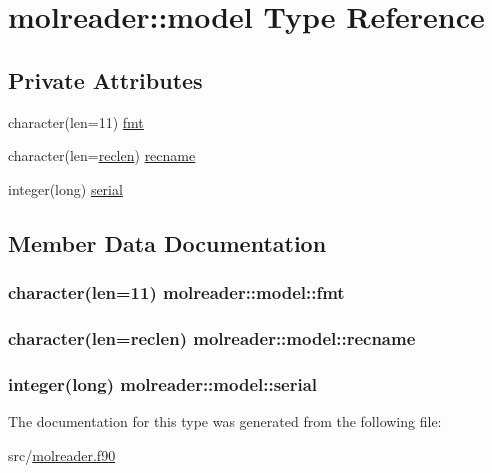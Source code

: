 \hypertarget{structmolreader_1_1model}{\section{molreader\-:\-:model Type Reference}
\label{structmolreader_1_1model}
}
\subsection*{Private Attributes}
\begin{DoxyCompactItemize}
\item 
character(len=11) \hyperlink{structmolreader_1_1model_a23b8930632b27e87549d8b297f827fd6}{fmt}
\item 
character(len=\hyperlink{classmolreader_a8f12be3272b946fd698c9fbaf2ba9d32}{reclen}) \hyperlink{structmolreader_1_1model_abac2ce11a9e639f8e2c4b29e40e87298}{recname}
\item 
integer(long) \hyperlink{structmolreader_1_1model_aff0c60ac8af22248ab65fa453bf87e6a}{serial}
\end{DoxyCompactItemize}


\subsection{Member Data Documentation}
\hypertarget{structmolreader_1_1model_a23b8930632b27e87549d8b297f827fd6}{
\subsubsection[{fmt}]{\setlength{\rightskip}{0pt plus 5cm}character(len=11) molreader\-::model\-::fmt\hspace{0.3cm}{\ttfamily [private]}}}\label{structmolreader_1_1model_a23b8930632b27e87549d8b297f827fd6}
\hypertarget{structmolreader_1_1model_abac2ce11a9e639f8e2c4b29e40e87298}{
\subsubsection[{recname}]{\setlength{\rightskip}{0pt plus 5cm}character(len={\bf reclen}) molreader\-::model\-::recname\hspace{0.3cm}{\ttfamily [private]}}}\label{structmolreader_1_1model_abac2ce11a9e639f8e2c4b29e40e87298}
\hypertarget{structmolreader_1_1model_aff0c60ac8af22248ab65fa453bf87e6a}{
\subsubsection[{serial}]{\setlength{\rightskip}{0pt plus 5cm}integer(long) molreader\-::model\-::serial\hspace{0.3cm}{\ttfamily [private]}}}\label{structmolreader_1_1model_aff0c60ac8af22248ab65fa453bf87e6a}


The documentation for this type was generated from the following file\-:\begin{DoxyCompactItemize}
\item 
src/\hyperlink{molreader_8f90}{molreader.\-f90}\end{DoxyCompactItemize}
